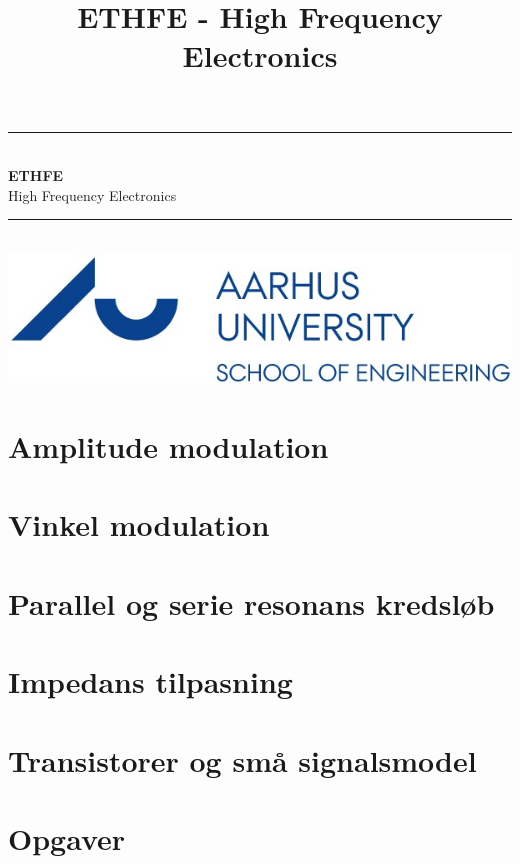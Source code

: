\documentclass[12pt,a4paper,danish,oneside]{book}
\title{ETHFE - High Frequency Electronics}
\newcommand{\HRule}{\rule{\linewidth}{0.5mm}}
\begin{document}
\begin{titlepage}
	\clearpage\thispagestyle{empty}

	\begin{center}
		\HRule \\[0.4cm]
		{\huge \bfseries ETHFE} \\[.3cm] {\huge High Frequency Electronics}\\[0cm]
		\HRule \\[3.4cm]
		\includegraphics[width=0.5\linewidth]{graphics/au}
	\end{center}
	\renewcommand{\contentsname}{Indholdsfortegnelse}
	\tableofcontents

\end{titlepage}

 

\chapter{Amplitude modulation}


\chapter{Vinkel modulation}


\chapter{Parallel og serie resonans kredsløb}


\chapter{Impedans tilpasning}


\chapter{Transistorer og små signalsmodel}


\chapter{Opgaver}




\end{document}
